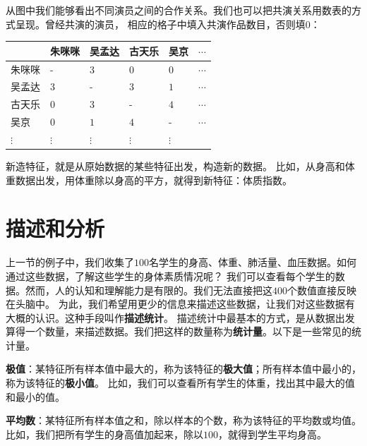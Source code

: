 \documentclass[12pt,UTF8]{ctexbook}
\begin{document}
从图中我们能够看出不同演员之间的合作关系。我们也可以把共演关系用数表的方式呈现。曾经共演的演员，
相应的格子中填入共演作品数目，否则填$0$：
\begin{center}
    \begin{tabular}{ | p{3.2em}<{\centering} | p{3.2em}<{\centering} | p{3.2em}<{\centering} | p{3.2em}<{\centering} | p{3.2em}<{\centering} | p{2em}<{\centering} | }
        \hline
           & 朱咪咪 & 吴孟达 & 古天乐 & 吴京 & $\cdots$ \\ [0.5ex]
        \hline
        朱咪咪 & - & $3$ & $0$ & $0$ & $\cdots$ \\  
        \hline
        吴孟达 & $3$ & - & $3$ & $1$ & $\cdots$ \\  
        \hline
        古天乐 & $0$ & $3$ & - & $4$ & $\cdots$ \\ 
        \hline
        吴京 & $0$ & $1$ & $4$ & - & $\cdots$ \\ 
        \hline
        $\vdots$ & $\vdots$ & $\vdots$ & $\vdots$ & $\vdots$ &  \\  
        \hline
    \end{tabular}
\end{center}

新造特征，就是从原始数据的某些特征出发，构造新的数据。
比如，从身高和体重数据出发，用体重除以身高的平方，就得到新特征：体质指数。


\section{描述和分析}
上一节的例子中，我们收集了$100$名学生的身高、体重、肺活量、血压数据。如何通过这些数据，了解这些学生的身体素质情况呢？
我们可以查看每个学生的数据。然而，人的认知和理解能力是有限的。我们无法直接把这$400$个数值直接反映在头脑中。
为此，我们希望用更少的信息来描述这些数据，让我们对这些数据有大概的认识。这种手段叫作\textbf{描述统计}。
描述统计中最基本的方式，是从数据出发算得一个数量，来描述数据。我们把这样的数量称为\textbf{统计量}。以下是一些常见的统计量。

\textbf{极值}：某特征所有样本值中最大的，称为该特征的\textbf{极大值}；所有样本值中最小的，称为该特征的\textbf{极小值}。
比如，我们可以查看所有学生的体重，找出其中最大的值和最小的值。

\textbf{平均数}：某特征所有样本值之和，除以样本的个数，称为该特征的平均数或均值。
比如，我们把所有学生的身高值加起来，除以$100$，就得到学生平均身高。
\end{document}
